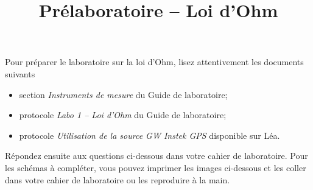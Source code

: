 \documentclass[letterpaper, DIV=11]{scrartcl}
\title{Prélaboratoire -- Loi d'Ohm}
\author{}
\date{}
\begin{document}
\maketitle

Pour préparer le laboratoire sur la loi d'Ohm, lisez attentivement les documents suivants
\begin{itemize}
  \item section \textit{Instruments de mesure} du Guide de laboratoire;
  \item protocole \textit{Labo 1 -- Loi d'Ohm} du Guide de laboratoire;
  \item protocole \textit{Utilisation de la source GW Instek GPS} disponible sur Léa.
\end{itemize}

Répondez ensuite aux questions ci-dessous dans votre cahier de laboratoire.
Pour les schémas à compléter, vous pouvez imprimer les images ci-dessous et les
coller dans votre cahier de laboratoire ou les reproduire à la main.
\end{document}
